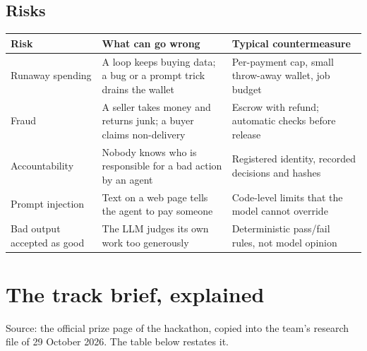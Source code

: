 \subsection{Risks}
\begin{center}
\small
\begin{tabularx}{\textwidth}{@{}p{3.2cm}XX@{}}
\toprule
\textbf{Risk} & \textbf{What can go wrong} & \textbf{Typical countermeasure} \\
\midrule
Runaway spending & A loop keeps buying data; a bug or a prompt trick drains the wallet & Per-payment cap, small throw-away wallet, job budget \\
Fraud & A seller takes money and returns junk; a buyer claims non-delivery & Escrow with refund; automatic checks before release \\
Accountability & Nobody knows who is responsible for a bad action by an agent & Registered identity, recorded decisions and hashes \\
Prompt injection & Text on a web page tells the agent to pay someone & Code-level limits that the model cannot override \\
Bad output accepted as good & The LLM judges its own work too generously & Deterministic pass/fail rules, not model opinion \\
\bottomrule
\end{tabularx}
\end{center}

\section{The track brief, explained}

Source: the official prize page of the hackathon, copied into the team's research file of 29 October 2026. The table below restates it.

